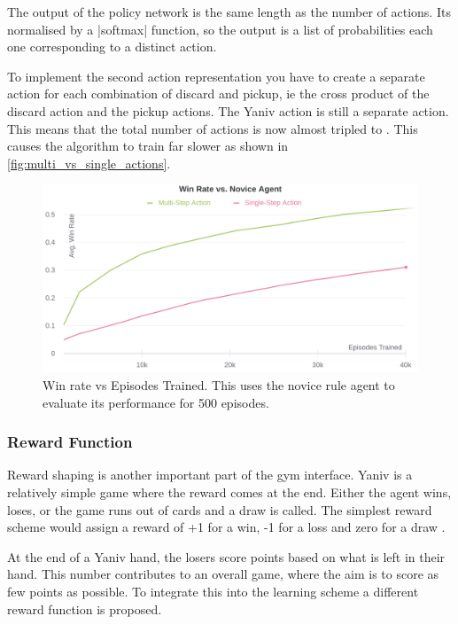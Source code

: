 \documentclass[../main.tex]{subfiles}
\begin{document}
The output of the policy network is the same length as the number of actions. Its normalised by a |softmax| function, so the output is a list of probabilities each one corresponding to a distinct action. 

To implement the second action representation you have to create a separate action for each combination of discard and pickup, ie the cross product of the discard action and the pickup actions. The Yaniv action is still a separate action. This means that the total number of actions is now almost tripled to . This causes the algorithm to train far slower as shown in \autoref{fig:multi_vs_single_actions}.

\begin{figure}
    \centering
    \includegraphics[width=\textwidth,keepaspectratio]{images/method/multi_vs_single_actions.png}
    \caption{Win rate vs Episodes Trained. This uses the novice rule agent to evaluate its performance for 500 episodes.}
    \label{fig:multi_vs_single_actions}
\end{figure}


\subsubsection{Reward Function}

Reward shaping is another important part of the gym interface. Yaniv is a relatively simple game where the reward comes at the end. Either the agent wins, loses, or the game runs out of cards and a draw is called. The simplest reward scheme would assign a reward of +1 for a win, -1 for a loss and zero for a draw \cite{warchalski_deep_2020}.

At the end of a Yaniv hand, the losers score points based on what is left in their hand. This number contributes to an overall game, where the aim is to score as few points as possible. To integrate this into the learning scheme a different reward function is proposed. 
\end{document}
